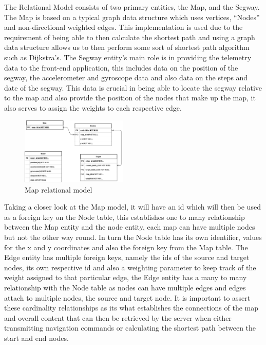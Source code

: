 The Relational Model consists of two primary entities, the Map, and the Segway. The Map is based on a typical graph data structure which uses vertices, “Nodes” and non-directional weighted edges. This implementation is used due to the requirement of being able to then calculate the shortest path and using a graph data structure allows us to then perform some sort of shortest path algorithm such as Dijkstra’s. The Segway entity’s main role is in providing the telemetry data to the front-end application, this includes data on the position of the segway, the accelerometer and gyroscope data and also data on the steps and date of the segway. This data is crucial in being able to locate the segway relative to the map and also provide the position of the nodes that make up the map, it also serves to assign the weights to each respective edge. 
\begin{figure}
    \centerline{\includegraphics[width=0.45\textwidth]{images/map-orm.png}}
    \caption{Map relational model}
\end{figure}

Taking a closer look at the Map model, it will have an id which will then be used as a foreign key on the Node table, this establishes one to many relationship between the Map entity and the node entity, each map can have multiple nodes but not the other way round. In turn the Node table has its own identifier, values for the x and y coordinates and also the foreign key from the Map table. The Edge entity has multiple foreign keys, namely the ids of the source and target nodes, its own respective id and also a weighting parameter to keep track of the weight assigned to that particular edge, the Edge entity has a many to many relationship with the Node table as nodes can have multiple edges and edges attach to multiple nodes, the source and target node. It is important to assert these cardinality relationships as its what establishes the connections of the map and overall content that can then be retrieved by the server when either transmitting navigation commands or calculating the shortest path between the start and end nodes.

